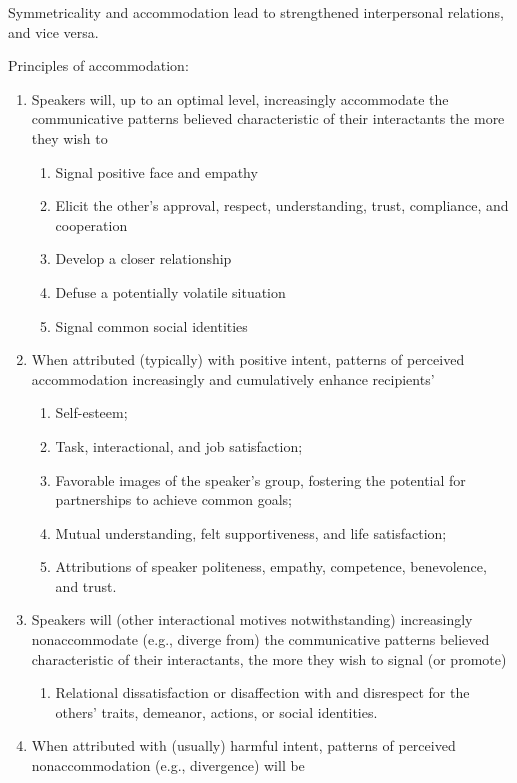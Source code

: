 \documentclass[
]{book}
\providecommand{\tightlist}{%
  \setlength{\itemsep}{0pt}\setlength{\parskip}{0pt}}
\begin{document}
Symmetricality and accommodation lead to strengthened interpersonal relations, and vice versa.

Principles of accommodation:

\begin{enumerate}
\def\labelenumi{\arabic{enumi}.}
\item
  Speakers will, up to an optimal level, increasingly accommodate the communicative patterns believed characteristic
  of their interactants the more they wish to

  \begin{enumerate}
  \def\labelenumii{\arabic{enumii}.}
  \item
    Signal positive face and empathy
  \item
    Elicit the other's approval, respect, understanding, trust, compliance, and cooperation
  \item
    Develop a closer relationship
  \item
    Defuse a potentially volatile situation
  \item
    Signal common social identities
  \end{enumerate}
\item
  When attributed (typically) with positive intent, patterns of perceived accommodation increasingly and cumulatively
  enhance recipients'

  \begin{enumerate}
  \def\labelenumii{\arabic{enumii}.}
  \item
    Self-esteem;
  \item
    Task, interactional, and job satisfaction;
  \item
    Favorable images of the speaker's group, fostering the potential for partnerships to achieve common goals;
  \item
    Mutual understanding, felt supportiveness, and life satisfaction;
  \item
    Attributions of speaker politeness, empathy, competence, benevolence, and trust.
  \end{enumerate}
\item
  Speakers will (other interactional motives notwithstanding) increasingly nonaccommodate (e.g., diverge from) the
  communicative patterns believed characteristic of their interactants, the more they wish to signal (or promote)

  \begin{enumerate}
  \def\labelenumii{\arabic{enumii}.}
  \tightlist
  \item
    Relational dissatisfaction or disaffection with and disrespect for the others' traits, demeanor, actions, or
    social identities.
  \end{enumerate}
\item
  When attributed with (usually) harmful intent, patterns of perceived nonaccommodation (e.g., divergence) will be


\end{enumerate}
\end{document}
